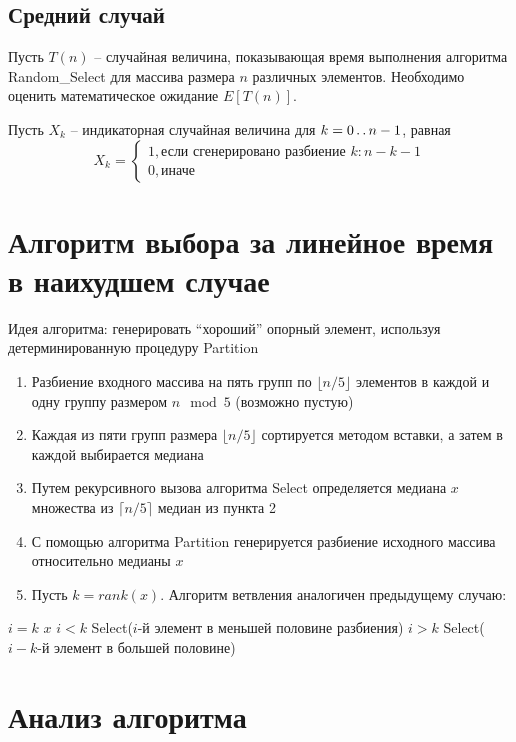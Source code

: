 \documentclass[11pt]{article}
\begin{document}
\subsection{Средний случай}
Пусть $T(n)$ -- случайная величина, показывающая время выполнения алгоритма Random\_Select для массива размера $n$ различных элементов. Необходимо оценить математическое ожидание $E[T(n)]$.

Пусть $X_k$ -- индикаторная случайная величина для $k = 0 \mathinner{\ldotp\ldotp} n-1$, равная
\begin{equation*}
  X_k = \begin{cases}
      1, \text{если сгенерировано разбиение } k:n-k-1 \\
      0, \text{иначе}
  \end{cases}
\end{equation*}

\section{Алгоритм выбора за линейное время в наихудшем случае}

Идея алгоритма: генерировать ``хороший'' опорный элемент, используя детерминированную процедуру Partition
\begin{enumerate}
\item Разбиение входного массива на пять групп по $\lfloor n/5 \rfloor$ элементов в каждой и одну группу размером $n \mod{5}$ (возможно пустую)
\item Каждая из пяти групп размера $\lfloor n/5 \rfloor$ сортируется методом вставки, а затем в каждой выбирается медиана
\item Путем рекурсивного вызова алгоритма Select определяется медиана $x$ множества из $\lceil n/5 \rceil$ медиан из пункта 2
\item С помощью алгоритма Partition генерируется разбиение исходного массива относительно медианы $x$
\item Пусть $k = rank(x)$. Алгоритм ветвления аналогичен предыдущему случаю:
\end{enumerate}

\begin{codebox}
\li \If $i = k$ 
\li \Then \Return $x$
\li \ElseIf $i < k$
\li \Then \Return Select($i$-й элемент в меньшей половине разбиения)
\li \ElseIf $i > k$
\li \Then \Return Select($i-k$-й элемент в большей половине)
\End
\end{codebox}

\section{Анализ алгоритма}
\end{document}
